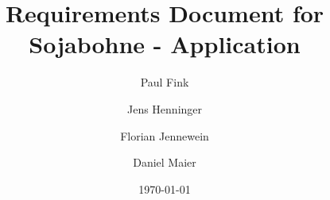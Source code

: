 \documentclass{book}
\title{Requirements Document for \\
Sojabohne - Application \\
}
\author{Paul Fink \and Jens Henninger \and Florian Jennewein \and Daniel Maier}
\date{\today}
\begin{document}

\maketitle


\printglossaries

\tableofcontents




\end{document}
